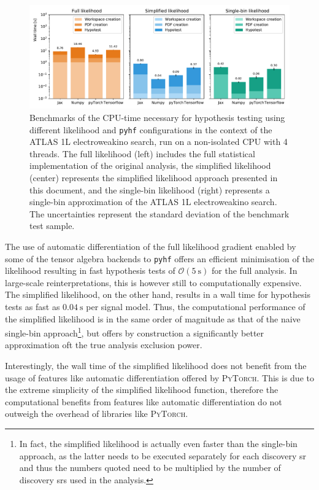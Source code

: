 \begin{figure}
	\centering    
	\includegraphics[width=\textwidth]{benchmark_1Lbb}
	\caption{Benchmarks of the CPU-time necessary for hypothesis testing using different likelihood and \texttt{pyhf} configurations in the context of the ATLAS 1L electroweakino search, run on a non-isolated CPU with 4 threads. The full likelihood (left) includes the full statistical implementation of the original analysis, the simplified likelihood (center) represents the simplified likelihood approach presented in this document, and the single-bin likelihood (right) represents a single-bin approximation of the ATLAS 1L electroweakino search. The uncertainties represent the standard deviation of the benchmark test sample.}\label{fig:benchmark}
	\label{fig:benchmark_1Lbb}
\end{figure}

The use of automatic differentiation of the full likelihood gradient enabled by some of the tensor algebra backends to \texttt{pyhf} offers an efficient minimisation of the likelihood resulting in fast hypothesis tests of $\mathcal{O}(\SI{5}{\second})$ for the full analysis. In large-scale reinterpretations, this is however still to computationally expensive. The simplified likelihood, on the other hand, results in a wall time for hypothesis tests as fast as $\SI{0.04}{\second}$ per signal model. Thus, the computational performance of the simplified likelihood is in the same order of magnitude as that of the naive single-bin approach\footnote{In fact, the simplified likelihood is actually even faster than the single-bin approach, as the latter needs to be executed separately for each discovery \gls{sr} and thus the numbers quoted need to be multiplied by the number of discovery \glspl{sr} used in the analysis.}, but offers by construction a significantly better approximation oft the true analysis exclusion power.

Interestingly, the wall time of the simplified likelihood does not benefit from the usage of features like automatic differentiation offered by \eg \textsc{PyTorch}. This is due to the extreme simplicity of the simplified likelihood function, therefore the computational benefits from features like automatic differentiation do not outweigh the overhead of libraries like \textsc{PyTorch}.

